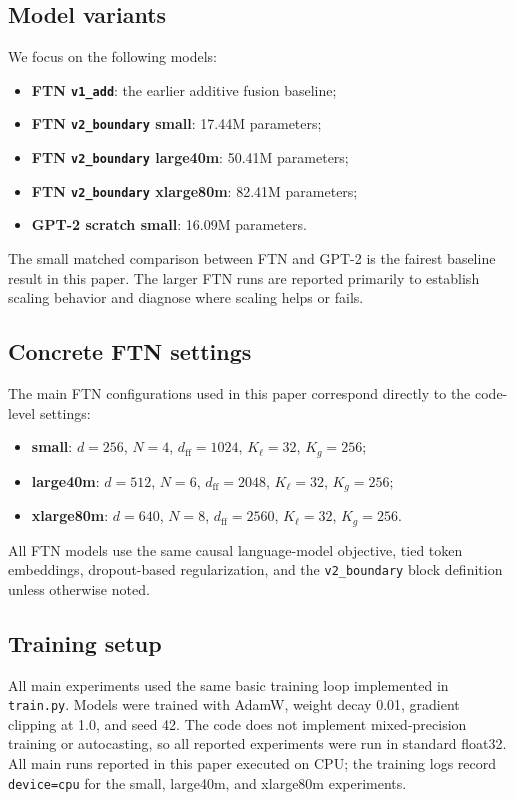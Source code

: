 \documentclass[11pt]{article}
\begin{document}
\subsection{Model variants}
We focus on the following models:
\begin{itemize}[leftmargin=1.5em]
    \item \textbf{FTN \texttt{v1\_add}}: the earlier additive fusion baseline;
    \item \textbf{FTN \texttt{v2\_boundary} small}: 17.44M parameters;
    \item \textbf{FTN \texttt{v2\_boundary} large40m}: 50.41M parameters;
    \item \textbf{FTN \texttt{v2\_boundary} xlarge80m}: 82.41M parameters;
    \item \textbf{GPT-2 scratch small}: 16.09M parameters.
\end{itemize}

The small matched comparison between FTN and GPT-2 is the fairest baseline result in this paper. The larger FTN runs are reported primarily to establish scaling behavior and diagnose where scaling helps or fails.

\subsection{Concrete FTN settings}
The main FTN configurations used in this paper correspond directly to the code-level settings:
\begin{itemize}[leftmargin=1.5em]
    \item \textbf{small}: $d=256$, $N=4$, $d_{\mathrm{ff}}=1024$, $K_{\ell}=32$, $K_g=256$;
    \item \textbf{large40m}: $d=512$, $N=6$, $d_{\mathrm{ff}}=2048$, $K_{\ell}=32$, $K_g=256$;
    \item \textbf{xlarge80m}: $d=640$, $N=8$, $d_{\mathrm{ff}}=2560$, $K_{\ell}=32$, $K_g=256$.
\end{itemize}
All FTN models use the same causal language-model objective, tied token embeddings, dropout-based regularization, and the \texttt{v2\_boundary} block definition unless otherwise noted.

\subsection{Training setup}
All main experiments used the same basic training loop implemented in \texttt{train.py}. Models were trained with AdamW, weight decay 0.01, gradient clipping at 1.0, and seed 42. The code does not implement mixed-precision training or autocasting, so all reported experiments were run in standard float32. All main runs reported in this paper executed on CPU; the training logs record \texttt{device=cpu} for the small, large40m, and xlarge80m experiments.
\end{document}
